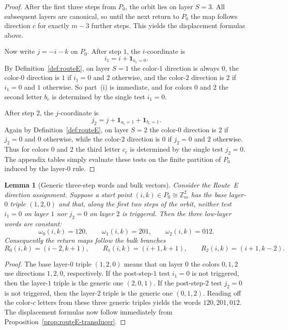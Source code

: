 \documentclass[11pt]{article}
\newtheorem{lemma}{Lemma}
\newcommand{\Zm}{\mathbb Z_m}
\begin{document}
\begin{proof}
After the first three steps from $P_0$, the orbit lies on layer $S=3$.
All subsequent layers are canonical, so until the next return to $P_0$ the map follows direction $c$ for exactly $m-3$ further steps.
This yields the displacement formulas above.

Now write $j=-i-k$ on $P_0$.
After step $1$, the $i$-coordinate is
\[
i_1=i+\mathbf 1_{a_c=0}.
\]
By Definition~\ref{def:routeE}, on layer $S=1$ the color-$1$ direction is always $0$, the color-$0$ direction is $1$ if $i_1=0$ and $2$ otherwise, and the color-$2$ direction is $2$ if $i_1=0$ and $1$ otherwise.
So part~\textup{(i)} is immediate, and for colors $0$ and $2$ the second letter $b_c$ is determined by the single test $i_1=0$.

After step $2$, the $j$-coordinate is
\[
j_2=j+\mathbf 1_{a_c=1}+\mathbf 1_{b_c=1}.
\]
Again by Definition~\ref{def:routeE}, on layer $S=2$ the color-$0$ direction is $2$ if $j_2=0$ and $0$ otherwise, while the color-$2$ direction is $0$ if $j_2=0$ and $2$ otherwise.
Thus for colors $0$ and $2$ the third letter $c_c$ is determined by the single test $j_2=0$.
The appendix tables simply evaluate these tests on the finite partition of $P_0$ induced by the layer-$0$ rule.
\end{proof}

\begin{lemma}[Generic three-step words and bulk vectors]\label{lem:routeE-generic}
Consider the Route~E direction assignment.
Suppose a start point $(i,k)\in P_0\cong\Zm^2$ has the base layer-$0$ triple $(1,2,0)$ and that, along the first two steps of the orbit, neither test $i_1=0$ on layer $1$ nor $j_2=0$ on layer $2$ is triggered.
Then the three low-layer words are constant:
\[
\omega_0(i,k)=120,\qquad \omega_1(i,k)=201,\qquad \omega_2(i,k)=012.
\]
Consequently the return maps follow the bulk branches
\[
R_0(i,k)=(i-2,k+1),\qquad R_1(i,k)=(i+1,k+1),\qquad R_2(i,k)=(i+1,k-2).
\]
\end{lemma}

\begin{proof}
The base layer-$0$ triple $(1,2,0)$ means that on layer $0$ the colors $0,1,2$ use directions $1,2,0$, respectively.
If the post-step-$1$ test $i_1=0$ is not triggered, then the layer-$1$ triple is the generic one $(2,0,1)$.
If the post-step-$2$ test $j_2=0$ is not triggered, then the layer-$2$ triple is the generic one $(0,1,2)$.
Reading off the color-$c$ letters from these three generic triples yields the words $120,201,012$.
The displacement formulas now follow immediately from Proposition~\ref{prop:routeE-transducer}.
\end{proof}
\end{document}
